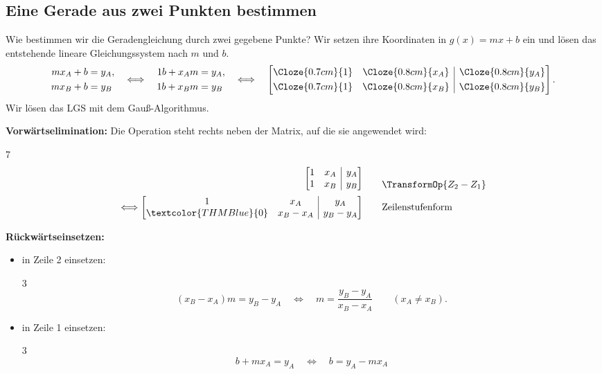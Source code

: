 \subsection{Eine Gerade aus zwei Punkten bestimmen}
\label{subsec:real_functions_two_points}
Wie bestimmen wir die Geradengleichung durch zwei gegebene Punkte? Wir setzen
ihre Koordinaten in $g(x)=mx+b$ ein und lösen das entstehende lineare
Gleichungssystem nach $m$ und $b$.
\[
  \begin{aligned}
    mx_A+b&=y_A,\\
    mx_B+b&=y_B
  \end{aligned}
  \quad\Longleftrightarrow\quad
  \begin{aligned}
    1 b+x_A m&=y_A,\\
    1 b+x_B m&=y_B
  \end{aligned}
  \quad\Longleftrightarrow\quad
  \left[\begin{array}{@{}cc|c@{}}
    \Cloze{0.7cm}{1}&\Cloze{0.8cm}{x_A}&\Cloze{0.8cm}{y_A}\\[0.3em]
    \Cloze{0.7cm}{1}&\Cloze{0.8cm}{x_B}&\Cloze{0.8cm}{y_B}
  \end{array}\right].
\]
Wir lösen das LGS mit dem Gauß-Algorithmus. 
\par\noindent\textbf{Vorwärtselimination:} Die Operation steht rechts neben der Matrix,
auf die sie angewendet wird:
\begin{ClozeArea}[34]{7}
  \[
    \begin{array}{r@{\;}r@{\qquad}l}
      &\left[\begin{array}{@{}cc|c@{}}
        1&x_A&y_A\\
        1&x_B&y_B
      \end{array}\right]
      &\raisebox{-0.65em}{\(\TransformOp{Z_2-Z_1}\)}\\[1.2em]
      \Longleftrightarrow
      &\left[\begin{array}{@{}cc|c@{}}
        1&x_A&y_A\\
        \textcolor{THMBlue}{0}&x_B-x_A&y_B-y_A
      \end{array}\right]
      &\text{Zeilenstufenform}
    \end{array}
  \]
\end{ClozeArea}
\noindent\textbf{Rückwärtseinsetzen:}
\begin{itemize}[leftmargin=1.4em,itemsep=0.55em,topsep=0.3em]
  \item in Zeile 2 einsetzen:
    \begin{ClozeArea}[32]{3}
      \[
        (x_B-x_A)m=y_B-y_A
        \quad\Longleftrightarrow\quad
        m=\frac{y_B-y_A}{x_B-x_A}
        \qquad (x_A\ne x_B).
      \]
    \end{ClozeArea}
  \item in Zeile 1 einsetzen:
    \begin{ClozeArea}[32]{3}
      \[
        b + m x_A = y_A \quad \Longleftrightarrow \quad b=y_A-m x_A
      \]
    \end{ClozeArea}
\end{itemize}
